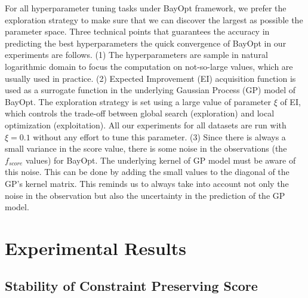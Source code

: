 For all hyperparameter tuning tasks under BayOpt framework, we prefer the exploration strategy to make sure that we can discover the largest as possible the parameter space.
Three technical points that guarantees the accuracy in predicting the best hyperparameters the quick convergence of BayOpt in our experiments are follows.
(1) The hyperparameters are sample in natural logarithmic domain to focus the computation on not-so-large values, which are usually used in practice.
(2) Expected Improvement (EI) acquisition function is used as a surrogate function in the underlying Gaussian Process (GP) model of BayOpt.
The exploration strategy is set using a large value of parameter $\xi$ of EI, which controls the trade-off between global search (exploration) and local optimization (exploitation).
All our experiments for all datasets are run with $\xi=0.1$ without any effort to tune this parameter.
(3) Since there is always a small variance in the score value, there is some noise in the observations (the $f_{score}$ values) for BayOpt.
The underlying kernel of GP model must be aware of this noise.
This can be done by adding the small values to the diagonal of the GP's kernel matrix.
This reminds us to always take into account not only the noise in the observation but also the uncertainty in the prediction of the GP model.

\section{Experimental Results}

\subsection{Stability of Constraint Preserving Score}\label{sec:result:stability}

